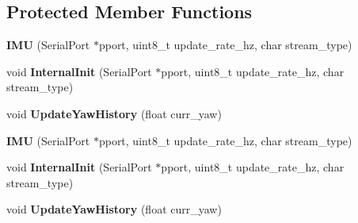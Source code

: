 \subsection*{Protected Member Functions}
\begin{DoxyCompactItemize}
\item 
\hypertarget{class_i_m_u_a5768eb5fa968177300dd9e4a16bda86f}{}{\bfseries I\+M\+U} (Serial\+Port $\ast$pport, uint8\+\_\+t update\+\_\+rate\+\_\+hz, char stream\+\_\+type)\label{class_i_m_u_a5768eb5fa968177300dd9e4a16bda86f}

\item 
\hypertarget{class_i_m_u_a8032d6903cf70281086c07ebdfe16b80}{}void {\bfseries Internal\+Init} (Serial\+Port $\ast$pport, uint8\+\_\+t update\+\_\+rate\+\_\+hz, char stream\+\_\+type)\label{class_i_m_u_a8032d6903cf70281086c07ebdfe16b80}

\item 
\hypertarget{class_i_m_u_ad005f8d336dbfc0fd53efdb8c3976fc9}{}void {\bfseries Update\+Yaw\+History} (float curr\+\_\+yaw)\label{class_i_m_u_ad005f8d336dbfc0fd53efdb8c3976fc9}

\item 
\hypertarget{class_i_m_u_a5768eb5fa968177300dd9e4a16bda86f}{}{\bfseries I\+M\+U} (Serial\+Port $\ast$pport, uint8\+\_\+t update\+\_\+rate\+\_\+hz, char stream\+\_\+type)\label{class_i_m_u_a5768eb5fa968177300dd9e4a16bda86f}

\item 
\hypertarget{class_i_m_u_a8032d6903cf70281086c07ebdfe16b80}{}void {\bfseries Internal\+Init} (Serial\+Port $\ast$pport, uint8\+\_\+t update\+\_\+rate\+\_\+hz, char stream\+\_\+type)\label{class_i_m_u_a8032d6903cf70281086c07ebdfe16b80}

\item 
\hypertarget{class_i_m_u_ad005f8d336dbfc0fd53efdb8c3976fc9}{}void {\bfseries Update\+Yaw\+History} (float curr\+\_\+yaw)\label{class_i_m_u_ad005f8d336dbfc0fd53efdb8c3976fc9}

\end{DoxyCompactItemize}
